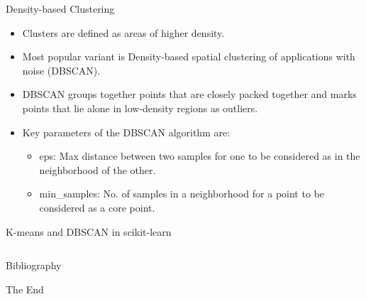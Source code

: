 \documentclass[aspectratio=169]{beamer}
\begin{document}
\begin{frame}{Density-based Clustering}
    \begin{itemize}
        \item Clusters are defined as areas of higher density.
        \item Most popular variant is Density-based spatial clustering of applications with noise (DBSCAN).\cite{esterDensityBasedAlgorithmDiscovering}
        \item DBSCAN groups together points that are closely packed together and marks points that lie alone in low-density regions as outliers. 
        \item Key parameters of the DBSCAN algorithm are:
        \begin{itemize}
            \item eps: Max distance between two samples for one to be considered as in the neighborhood of the other. 
            \item min\_samples: No. of samples in a neighborhood for a point to be considered as a core point.
        \end{itemize}
    \end{itemize}
\end{frame}


\begin{frame}[fragile]{K-means and DBSCAN in scikit-learn}
\inputminted{python}{example_sklearn_clustering.py}
\end{frame}



\begin{frame}[allowframebreaks]{Bibliography}
    
    
\end{frame}




\begin{frame}
    \Huge{\centerline{The End}}
\end{frame}
\end{document}
